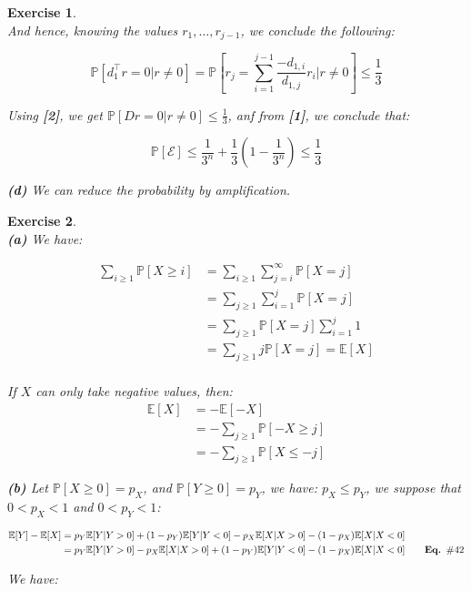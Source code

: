 \documentclass{article}
\newtheorem{exo}{Exercise}
\def\P{\mathbb{P}}
\def\E{\mathbb{E}}
\begin{document}
\begin{exo}{\ \\}
And hence, knowing the values $r_1, \dots, r_{j-1}$, we conclude the following:


\[
\P[d_1^\top r = 0 | r\neq0]
= \P\left[r_j = \sum^{j-1}_{i=1} \frac{-d_{1,i}}{d_{1,j}} r_i |r\neq0\right] \leq \frac{1}{3} 
\]

Using \textbf{[2]}, we get $\P[D r = 0 | r\neq0] \leq \frac{1}{3}$, anf from \textbf{[1]}, we conclude that:

\[
\P[\mathcal{E}] \leq \frac{1}{3^n} + \frac{1}{3}(1- \frac{1}{3^n} ) \leq \frac{1}{3} 
\]

\noindent
\textbf{(d)} We can reduce the probability by amplification.

\end{exo}



\begin{exo}{\ \\}
\noindent    
\textbf{(a)} We have:

\begin{align*}
    \sum_{i\geq1} \P[X \geq i]
    &= \sum_{i\geq1} \sum_{j = i }^{\infty} \P[X=j] \\
    &= \sum_{j\geq1} \sum_{i=1}^{j} \P[X=j] \\
    &= \sum_{j\geq1} \P[X=j]\sum_{i=1}^{j}1  \\
    &= \sum_{j\geq1} j \P[X=j] = \E[X]\\
\end{align*}

If $X$ can only take negative values, then: 
\begin{align*}
    \E[X] 
    &= -\E[-X] \\
    &= -\sum_{j \geq 1} \P[-X \geq j] \\
    &= -\sum_{j \geq 1} \P[X \leq -j]
\end{align*}



\noindent    
\textbf{(b)} Let $\P[X\geq0] = p_X$, and $\P[Y\geq0] = p_Y$, we have: $p_X \leq p_Y$, we suppose that $0 < p_X < 1$ and $ 0 <  p_Y < 1$:

\begin{align*}
    \E[Y]-\E[X] 
    &= p_Y \E[Y|Y>0] + (1-p_Y)\E[Y|Y<0] -
    p_X \E[X|X>0] - (1-p_X)\E[X|X<0] \\
    &= p_Y \E[Y|Y>0] - p_X \E[X|X>0] 
    +(1-p_Y)\E[Y|Y<0] -  (1-p_X)\E[X|X<0] 
    \quad \quad \text{\textbf{Eq. $\#42$}}
\end{align*}

We have:



\end{exo}
\end{document}
